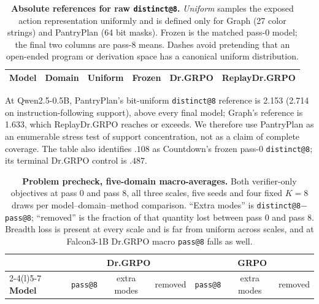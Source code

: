 \begin{table}[t]
  \centering
  \caption{\textbf{Absolute references for raw \texttt{distinct@8}.}
  \emph{Uniform} samples the exposed action representation uniformly and is
  defined only for Graph (27 color strings) and PantryPlan (64 bit masks).
  Frozen is the matched pass-0 model; the final two columns are pass-8 means.
  Dashes avoid pretending that an open-ended program or derivation space has a
  canonical uniform distribution.}
  \label{tab:absolute-support-references}
  \scriptsize
  \setlength{\tabcolsep}{4.2pt}
  \begin{tabular}{@{}llrrrr@{}}
    \toprule
    \textbf{Model} & \textbf{Domain} & \textbf{Uniform} & \textbf{Frozen}
      & \textbf{Dr.GRPO} & \textbf{ReplayDr.GRPO} \\
    \midrule
    
  \end{tabular}
\end{table}

At Qwen2.5-0.5B, PantryPlan's bit-uniform \texttt{distinct@8} reference is
2.153 (2.714 on instruction-following support), above every final model;
Graph's reference is 1.633, which ReplayDr.GRPO reaches or exceeds. We therefore
use PantryPlan as an enumerable stress test of support concentration, not as a
claim of complete coverage. The table also identifies \(.108\) as Countdown's
frozen pass-0 \texttt{distinct@8}; its terminal Dr.GRPO control is \(.487\).

\begin{table}[ht]
  \centering
  \caption{\textbf{Problem precheck, five-domain macro-averages.} Both
  verifier-only objectives at pass 0 and pass 8, all three scales, five seeds
  and four fixed $K=8$ draws per model--domain--method comparison. ``Extra modes'' is
  \texttt{distinct@8}$-$\texttt{pass@8}; ``removed'' is the fraction of that
  quantity lost between pass 0 and pass 8. Breadth loss is present at every
  scale and is far from uniform across scales, and at Falcon3-1B Dr.GRPO
  macro \texttt{pass@8} falls as well.}
  \label{tab:baseline-collapse-precheck}
  \small
  \setlength{\tabcolsep}{4.5pt}
  \begin{tabular}{@{}l*{6}{c}@{}}
    \toprule
    & \multicolumn{3}{c}{\textbf{Dr.GRPO}} & \multicolumn{3}{c}{\textbf{GRPO}} \\
    \cmidrule(lr){2-4}\cmidrule(l){5-7}
    \textbf{Model} & \texttt{pass@8} & extra modes & removed
                   & \texttt{pass@8} & extra modes & removed \\
    \midrule
    
  \end{tabular}
\end{table}

